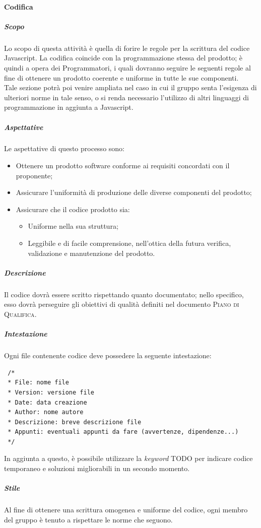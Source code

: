 \documentclass[../norme-di-progetto.tex]{subfiles}
\begin{document}
\paragraph{Codifica}
\subparagraph{Scopo}
Lo scopo di questa attività è quella di forire le regole per la scrittura del codice Javascript. La codifica coincide con la programmazione stessa del prodotto; è quindi a opera dei Programmatori, i quali dovranno seguire le seguenti regole al fine di ottenere un prodotto coerente e uniforme in tutte le sue componenti. \\
Tale sezione potrà poi venire ampliata nel caso in cui il gruppo senta l'esigenza di ulteriori norme in tale senso, o si renda necessario l'utilizzo di altri linguaggi di programmazione in aggiunta a Javascript.
\subparagraph{Aspettative}
Le aspettative di questo processo sono:
\begin{itemize}
  \item Ottenere un prodotto software conforme ai requisiti concordati con il proponente;
  \item Assicurare l'uniformità di produzione delle diverse componenti del prodotto;
  \item Assicurare che il codice prodotto sia:
  \begin{itemize}
    \item Uniforme nella sua struttura;
    \item Leggibile e di facile comprensione, nell'ottica della futura verifica, validazione e manutenzione del prodotto.
  \end{itemize}
\end{itemize}
\subparagraph{Descrizione}
Il codice dovrà essere scritto rispettando quanto documentato; nello specifico, esso dovrà perseguire gli obiettivi di qualità definiti nel documento \textsc{Piano di Qualifica}.

\subparagraph{Intestazione}
Ogni file contenente codice deve possedere la seguente intestazione:
\begin{lstlisting}
 /*
 * File: nome file
 * Version: versione file
 * Date: data creazione
 * Author: nome autore
 * Descrizione: breve descrizione file
 * Appunti: eventuali appunti da fare (avvertenze, dipendenze...)
 */
\end{lstlisting}
In aggiunta a questo, è possibile utilizzare la \textit{keyword} TODO per indicare codice temporaneo e soluzioni migliorabili in un secondo momento.

\subparagraph{Stile}
Al fine di ottenere una scrittura omogenea e uniforme del codice, ogni membro del gruppo è tenuto a rispettare le norme che seguono.
\end{document}
